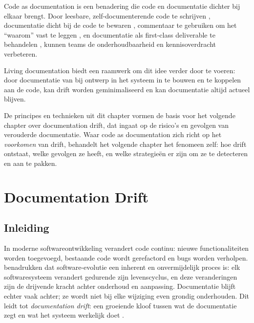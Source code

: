 Code as documentation is een benadering die code en documentatie dichter bij elkaar brengt. Door leesbare, zelf-documenterende code te schrijven \autocite{boswell2011readablecode}, documentatie dicht bij de code te bewaren \autocite{gentle2017docslikecode}, commentaar te gebruiken om het ``waarom'' vast te leggen \autocite{ousterhout2018philosophy}, en documentatie als first-class deliverable te behandelen \autocite{etter2016moderntechwriting}, kunnen teams de onderhoudbaarheid en kennisoverdracht verbeteren.

Living documentation \autocite{martraire2019livingdocumentation} biedt een raamwerk om dit idee verder door te voeren: door documentatie van bij ontwerp in het systeem in te bouwen en te koppelen aan de code, kan drift worden geminimaliseerd en kan documentatie altijd actueel blijven.

De principes en technieken uit dit chapter vormen de basis voor het volgende chapter over documentation drift, dat ingaat op de risico's en gevolgen van verouderde documentatie. Waar code as documentation zich richt op het \textit{voorkomen} van drift, behandelt het volgende chapter het fenomeen zelf: hoe drift ontstaat, welke gevolgen ze heeft, en welke strategieën er zijn om ze te detecteren en aan te pakken.

\chapter{Documentation Drift}
\label{chap:documentation-drift}

\section{Inleiding}
\label{sec:drift-intro}

In moderne softwareontwikkeling verandert code continu: nieuwe functionaliteiten worden toegevoegd, bestaande code wordt gerefactord en bugs worden verholpen. \textcite{tripathy2014softwareevolution} benadrukken dat software-evolutie een inherent en onvermijdelijk proces is: elk softwaresysteem verandert gedurende zijn levenscyclus, en deze veranderingen zijn de drijvende kracht achter onderhoud en aanpassing. Documentatie blijft echter vaak achter; ze wordt niet bij elke wijziging even grondig onderhouden. Dit leidt tot \textit{documentation drift}: een groeiende kloof tussen wat de documentatie zegt en wat het systeem werkelijk doet \autocite{whiting2020drifterosion}.

